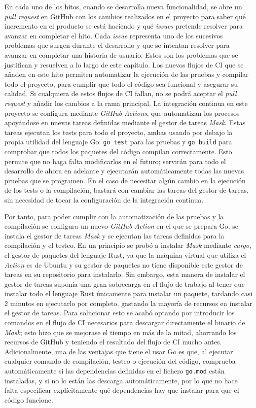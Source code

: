 En cada uno de los hitos, cuando se desarrolla nueva funcionalidad, se abre un
\textit{pull request} en GitHub con los cambios realizados en el proyecto para
saber qué incremento en el producto se está haciendo y qué \textit{issues}
pretende resolver para avanzar en completar el hito. Cada \textit{issue}
representa uno de los sucesivos problemas que surgen durante el desarrollo y que
se intentan resolver para avanzar en completar una historia de usuario. Estos
son los problemas que se justifican y resuelven a lo largo de este capítulo. Los
nuevos flujos de CI que se añaden en este hito permiten automatizar la ejecución
de las pruebas y compilar todo el proyecto, para cumplir que todo el código sea
funcional y asegurar su calidad. Si cualquiera de estos flujos de CI fallan, no
se podrá aceptar el \textit{pull request} y añadir los cambios a la rama
principal. La integración continua en este proyecto se configura mediante
\textit{GitHub Actions}, que automatizan los procesos apoyándose en nuevas
tareas definidas mediante el gestor de tareas \textit{Mask}. Estas tareas
ejecutan los tests para todo el proyecto, ambas usando por debajo la propia
utilidad del lenguaje Go: \texttt{go test} para las pruebas y \texttt{go build}
para comprobar que todos los paquetes del código compilan correctamente. Esto
permite que no haga falta modificarlos en el futuro; servirán para todo el
desarrollo de ahora en adelante y ejecutarán automáticamente todas las nuevas
pruebas que se programen. En el caso de necesitar algún cambio en la ejecución
de los tests o la compilación, bastará con cambiar las tareas del gestor de
tareas, sin necesidad de tocar la configuración de la integración continua.

Por tanto, para poder cumplir con la automatización de las pruebas y la
compilación se configura un nuevo \textit{GitHub Action} en el que se prepara
Go, se instala el gestor de tareas \textit{Mask} y se ejecutan las tareas
definidas para la compilación y el testeo. En un principio se probó a instalar
\textit{Mask} mediante \textit{cargo}, el gestor de paquetes del lenguaje Rust,
ya que la máquina virtual que utiliza el \textit{Action} es de Ubuntu y su
gestor de paquetes no tiene disponible este gestor de tareas en su repositorio
para instalarlo. Sin embargo, esta manera de instalar el gestor de tareas
suponía una gran sobrecarga en el flujo de trabajo al tener que instalar todo el
lenguaje Rust únicamente para instalar un paquete, tardando casi 2 minutos en
ejecutarlo por completo, gastando la mayoría de recursos en instalar el gestor
de tareas. Para solucionar esto se acabó optando por introducir los comandos en
el flujo de CI necesarios para descargar directamente el binario de
\textit{Mask}; esto hizo que se mejorase el tiempo en más de la mitad, ahorrando
los recursos de GitHub y teniendo el resultado del flujo de CI mucho antes.
Adicionalmente, una de las ventajas que tiene el usar Go es que, al ejecutar
cualquier comando de compilación, testeo o ejecución del código, comprueba
automáticamente si las dependencias definidas en el fichero \texttt{go.mod}
están instaladas, y si no lo están las descarga automáticamente, por lo que no
hace falta especificar explícitamente qué dependencias hay que instalar para que
el código funcione.

